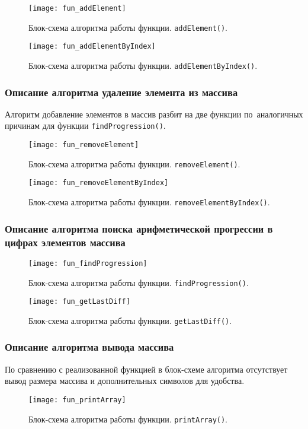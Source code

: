 \begin{figure}[H]
  \centering
  \texttt{[image: fun\_addElement]}
  \caption{
    Блок-схема алгоритма работы функции.
    \texttt{addElement()}.
  }
\end{figure}

\begin{figure}[H]
  \centering
  \texttt{[image: fun\_addElementByIndex]}
  \caption{
    Блок-схема алгоритма работы функции.
    \texttt{addElementByIndex()}.
  }
\end{figure}

\subsubsection{Описание алгоритма удаление элемента из массива}

Алгоритм добавление элементов в массив разбит на две функции
по аналогичных причинам для функции \texttt{findProgression()}.

\begin{figure}[H]
  \centering
  \texttt{[image: fun\_removeElement]}
  \caption{
    Блок-схема алгоритма работы функции.
    \texttt{removeElement()}.
  }
\end{figure}

\begin{figure}[H]
  \centering
  \texttt{[image: fun\_removeElementByIndex]}
  \caption{
    Блок-схема алгоритма работы функции.
    \texttt{removeElementByIndex()}.
  }
\end{figure}

\subsubsection{Описание алгоритма поиска арифметической прогрессии в цифрах элементов массива}

\begin{figure}[H]
  \centering
  \texttt{[image: fun\_findProgression]}
  \caption{
    Блок-схема алгоритма работы функции.
    \texttt{findProgression()}.
  }
\end{figure}

\begin{figure}[H]
  \centering
  \texttt{[image: fun\_getLastDiff]}
  \caption{
    Блок-схема алгоритма работы функции.
    \texttt{getLastDiff()}.
  }
\end{figure}

\subsubsection{Описание алгоритма вывода массива}

По сравнению с реализованной функцией в блок-схеме алгоритма
отсутствует вывод размера массива и дополнительных символов для удобства.

\begin{figure}[H]
  \centering
  \texttt{[image: fun\_printArray]}
  \caption{
    Блок-схема алгоритма работы функции.
    \texttt{printArray()}.
  }
\end{figure}
